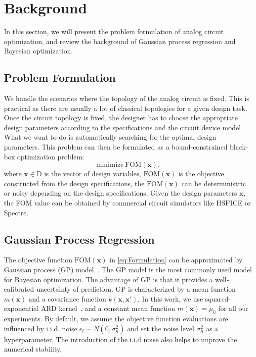 \section{Background}

In this section, we will present the problem formulation of analog circuit optimization, and review the background of Gaussian process regression and Bayesian optimization.

\subsection{Problem Formulation}


We handle the scenarios where the topology of the analog circuit is fixed. This
is practical as there are usually a lot of classical topologies for a given
design task. Once the circuit topology is fixed, the designer has to choose the
appropriate design parameters according to the specifications and the circuit
device model. What we want to do is automatically searching for the optimal
design parameters. This problem can then be formulated as a bound-constrained
black-box optimization problem:
\begin{equation}
    \label{eq:Formulation}
    \text{minimize}~\mathrm{FOM}(\bm{x}),
\end{equation}
where $\bm{x} \in \textrm{D}$ is the vector of design variables,
$\mathrm{FOM}(\bm{x})$ is the objective constructed from the design
specifications, the $\mathrm{FOM}(\bm{x})$ can be deterministric or noisy
depending on the design specifications. Given the design parameters $\bm{x}$,
the FOM value can be obtained by commercial circuit simulators like HSPICE or
Spectre.

\subsection{Gaussian Process Regression}


The objective function $\mathrm{FOM}(\bm{x})$ in \eqref{eq:Formulation} can be
approximated by Gaussian process (GP) model~\cite{GPML}. The GP model is the
most commonly used model for Bayesian optimization. The advantage of GP is that
it provides a well-calibrated uncertainty of prediction. GP is characterized by
a mean function $m(\bm{x})$ and a covariance function $k(\bm{x}, \bm{x'})$. In
this work, we use squared-exponential ARD kernel~\cite{GPML}, and a constant
mean function $m(\bm{x}) = \mu_0$ for all our experiments. By default, we
assume the objective function evaluations are influenced by i.i.d. noise
$\epsilon_t \sim N(0, \sigma_n^2)$ and set the noise level $\sigma_n^2$ as a
hyperparameter.  The introduction of the i.i.d noise also helps to improve the
numerical stability.

